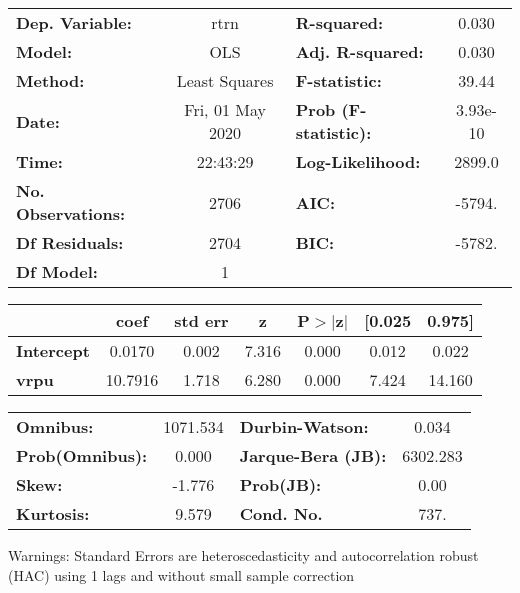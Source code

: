 \begin{center}
\begin{tabular}{lclc}
\toprule
\textbf{Dep. Variable:}    &       rtrn       & \textbf{  R-squared:         } &     0.030   \\
\textbf{Model:}            &       OLS        & \textbf{  Adj. R-squared:    } &     0.030   \\
\textbf{Method:}           &  Least Squares   & \textbf{  F-statistic:       } &     39.44   \\
\textbf{Date:}             & Fri, 01 May 2020 & \textbf{  Prob (F-statistic):} &  3.93e-10   \\
\textbf{Time:}             &     22:43:29     & \textbf{  Log-Likelihood:    } &    2899.0   \\
\textbf{No. Observations:} &        2706      & \textbf{  AIC:               } &    -5794.   \\
\textbf{Df Residuals:}     &        2704      & \textbf{  BIC:               } &    -5782.   \\
\textbf{Df Model:}         &           1      & \textbf{                     } &             \\
\bottomrule
\end{tabular}
\begin{tabular}{lcccccc}
                   & \textbf{coef} & \textbf{std err} & \textbf{z} & \textbf{P$> |$z$|$} & \textbf{[0.025} & \textbf{0.975]}  \\
\midrule
\textbf{Intercept} &       0.0170  &        0.002     &     7.316  &         0.000        &        0.012    &        0.022     \\
\textbf{vrpu}      &      10.7916  &        1.718     &     6.280  &         0.000        &        7.424    &       14.160     \\
\bottomrule
\end{tabular}
\begin{tabular}{lclc}
\textbf{Omnibus:}       & 1071.534 & \textbf{  Durbin-Watson:     } &    0.034  \\
\textbf{Prob(Omnibus):} &   0.000  & \textbf{  Jarque-Bera (JB):  } & 6302.283  \\
\textbf{Skew:}          &  -1.776  & \textbf{  Prob(JB):          } &     0.00  \\
\textbf{Kurtosis:}      &   9.579  & \textbf{  Cond. No.          } &     737.  \\
\bottomrule
\end{tabular}
\end{center}

Warnings: \newline
 [1] Standard Errors are heteroscedasticity and autocorrelation robust (HAC) using 1 lags and without small sample correction